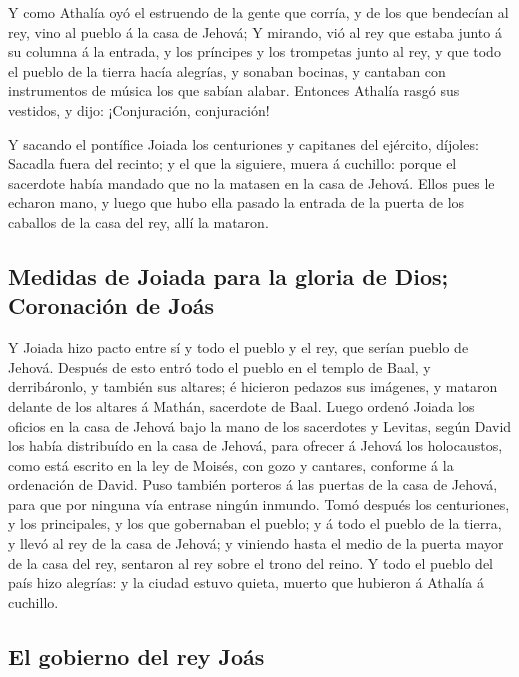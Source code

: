  Y como Athalía oyó el estruendo de la gente que corría,
y de los que bendecían al rey, vino al pueblo á la casa de Jehová;
 Y mirando, vió al rey que estaba junto á su columna á la
entrada, y los príncipes y los trompetas junto al rey, y que todo el
pueblo de la tierra hacía alegrías, y sonaban bocinas, y cantaban con
instrumentos de música los que sabían alabar. Entonces Athalía rasgó sus
vestidos, y dijo: ¡Conjuración, conjuración!

 Y sacando el pontífice Joiada los centuriones y
capitanes del ejército, díjoles: Sacadla fuera del recinto; y el que la
siguiere, muera á cuchillo: porque el sacerdote había mandado que no la
matasen en la casa de Jehová.  Ellos pues le echaron
mano, y luego que hubo ella pasado la entrada de la puerta de los
caballos de la casa del rey, allí la mataron.

\hypertarget{medidas-de-joiada-para-la-gloria-de-dios-coronaciuxf3n-de-jouxe1s}{%
\subsection{Medidas de Joiada para la gloria de Dios; Coronación de
Joás}\label{medidas-de-joiada-para-la-gloria-de-dios-coronaciuxf3n-de-jouxe1s}}

 Y Joiada hizo pacto entre sí y todo el pueblo y el rey,
que serían pueblo de Jehová.  Después de esto entró todo
el pueblo en el templo de Baal, y derribáronlo, y también sus altares; é
hicieron pedazos sus imágenes, y mataron delante de los altares á
Mathán, sacerdote de Baal.  Luego ordenó Joiada los
oficios en la casa de Jehová bajo la mano de los sacerdotes y Levitas,
según David los había distribuído en la casa de Jehová, para ofrecer á
Jehová los holocaustos, como está escrito en la ley de Moisés, con gozo
y cantares, conforme á la ordenación de David.  Puso
también porteros á las puertas de la casa de Jehová, para que por
ninguna vía entrase ningún inmundo.  Tomó después los
centuriones, y los principales, y los que gobernaban el pueblo; y á todo
el pueblo de la tierra, y llevó al rey de la casa de Jehová; y viniendo
hasta el medio de la puerta mayor de la casa del rey, sentaron al rey
sobre el trono del reino.  Y todo el pueblo del país hizo
alegrías: y la ciudad estuvo quieta, muerto que hubieron á Athalía á
cuchillo.

\hypertarget{el-gobierno-del-rey-jouxe1s}{%
\subsection{El gobierno del rey
Joás}\label{el-gobierno-del-rey-jouxe1s}}

